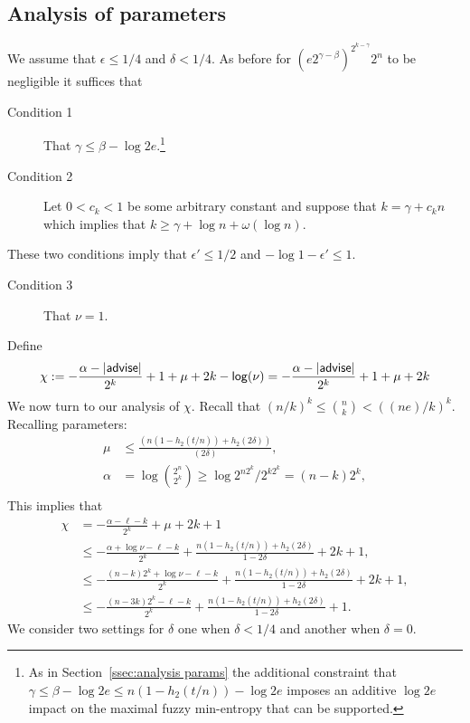 \subsection{Analysis of parameters}
We assume that $\epsilon\le 1/4$ and $\delta<1/4$.  As before for  
$
\left(e2^{\gamma-\beta}\right)^{2^{k-\gamma}}2^n$ to be negligible it suffices that
\begin{description}
\item[Condition 1] That $\gamma \le \beta-\log{2e}.$\footnote{As in Section~\ref{ssec:analysis params} the additional constraint that 
$
\gamma \le \beta - \log{2e}
\le n(1-h_2(t/n)) - \log{2e}$ imposes an additive $\log{2e}$ impact on the maximal fuzzy min-entropy that can be supported. 
}
\item[Condition 2] Let $0<c_k<1$ be some arbitrary constant and suppose that $k= \gamma+c_kn$ which implies that $k\ge \gamma + \log{n+\omega(\log{n})}$.
\end{description}
These two conditions imply that $\epsilon'\le 1/2$ and $-\log{1-\epsilon'}\le 1$.
\begin{description}
\item[Condition 3] That  $\nu = 1$.
\end{description}
Define \[\chi: =-\frac{\alpha-|{\mathsf{advise}}|}{2^k}+1+\mu+2k-\mathsf{log}\!\left(\nu\right)=-\frac{\alpha-|{\mathsf{advise}}|}{2^k}+1+\mu+2k\]
We now turn to our analysis of $\chi$.  Recall that $(n/k)^k \le {n\choose k} < ((ne)/k)^k$.  Recalling parameters: 
\begin{align*}
\mu&\le \frac{(n(1-h_2(t/n)) +h_2(2\delta))}{(2\delta)},\\
\alpha &= \log{2^n\choose 2^k} \ge \log{2^{n2^k} /2^{k2^k}} = (n-k)2^k,\\
\end{align*}
This implies that 
\begin{align*}
\chi&= -\frac{\alpha-\ell-k}{2^k} + \mu +2k+1\\
&\le  -\frac{\alpha +\log{\nu}-\ell-k}{2^k} +\frac{n(1-h_2(t/n)) +h_2(2\delta)}{1-2\delta}  + 2k+1,\\
&\le - \frac{(n-k)2^k +\log{\nu}-\ell-k}{2^k} +\frac{n(1-h_2(t/n)) +h_2(2\delta)}{1-2\delta} + 2k+1,\\
&\le  -\frac{(n-3k)2^k-\ell-k}{2^k} + \frac{n(1-h_2(t/n)) +h_2(2\delta)}{1-2\delta}+1.
\end{align*}
We consider two settings for $\delta$ one when $\delta<1/4$ and another when $\delta=0$.

